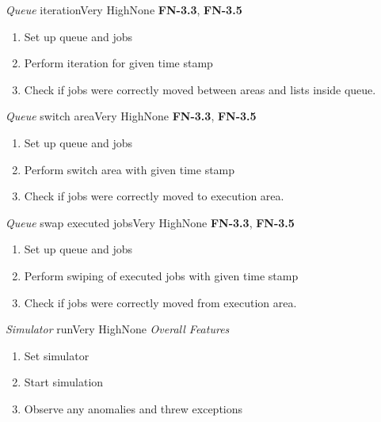 \begin{testcase}{\emph{Queue} iteration}{Very High}{None}
	{
		\textbf{FN-3.3}, \textbf{FN-3.5}
	}
	{
		\begin{enumerate}
			\item Set up queue and jobs
			\item Perform iteration for given time stamp
			\item Check if jobs were correctly moved between areas and lists inside queue.
		\end{enumerate}
	}
\end{testcase}

\begin{testcase}{\emph{Queue} switch area}{Very High}{None}
	{
		\textbf{FN-3.3}, \textbf{FN-3.5}
	}
	{
		\begin{enumerate}
			\item Set up queue and jobs
			\item Perform switch area with given time stamp
			\item Check if jobs were correctly moved to execution area.
		\end{enumerate}
	}
\end{testcase}


\begin{testcase}{\emph{Queue} swap executed jobs}{Very High}{None}
	{
		\textbf{FN-3.3}, \textbf{FN-3.5}
	}
	{
		\begin{enumerate}
			\item Set up queue and jobs
			\item Perform swiping of executed jobs with given time stamp
			\item Check if jobs were correctly moved from execution area.
		\end{enumerate}
	}
\end{testcase}


\begin{testcase}{\emph{Simulator} run}{Very High}{None}
	{
		\emph{Overall Features}
	}
	{
		\begin{enumerate}
			\item Set simulator
			\item Start simulation
			\item Observe any anomalies and threw exceptions
		\end{enumerate}
	}
\end{testcase}

